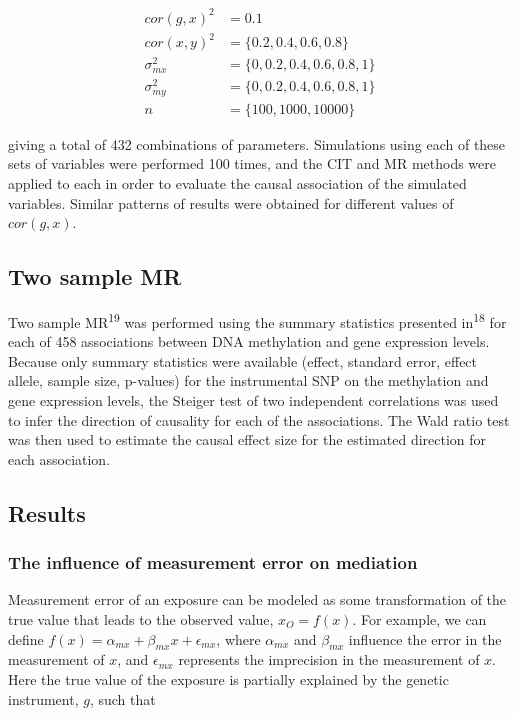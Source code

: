 \documentclass[]{article}
\begin{document}
\[
\begin{aligned}
cor(g, x)^2 & = 0.1 \\
cor(x, y)^2 & = \{0.2, 0.4, 0.6, 0.8\} \\
\sigma^2_{mx} & = \{0, 0.2, 0.4, 0.6, 0.8, 1\} \\
\sigma^2_{my} & = \{0, 0.2, 0.4, 0.6, 0.8, 1\} \\
n & = \{100, 1000, 10000\}
\end{aligned}
\]

giving a total of 432 combinations of parameters. Simulations using each
of these sets of variables were performed 100 times, and the CIT and MR
methods were applied to each in order to evaluate the causal association
of the simulated variables. Similar patterns of results were obtained
for different values of \(cor(g, x)\).

\subsection{Two sample MR}\label{two-sample-mr}

Two sample MR\textsuperscript{19} was performed using the summary
statistics presented in\textsuperscript{18} for each of 458 associations
between DNA methylation and gene expression levels. Because only summary
statistics were available (effect, standard error, effect allele, sample
size, p-values) for the instrumental SNP on the methylation and gene
expression levels, the Steiger test of two independent correlations was
used to infer the direction of causality for each of the associations.
The Wald ratio test was then used to estimate the causal effect size for
the estimated direction for each association.

\subsection{Results}\label{results}

\subsubsection{The influence of measurement error on
mediation}\label{the-influence-of-measurement-error-on-mediation}

Measurement error of an exposure can be modeled as some transformation
of the true value that leads to the observed value, \(x_O = f(x)\). For
example, we can define
\(f(x) = \alpha_{mx} + \beta_{mx} x + \epsilon_{mx}\), where
\(\alpha_{mx}\) and \(\beta_{mx}\) influence the error in the
measurement of \(x\), and \(\epsilon_{mx}\) represents the imprecision
in the measurement of \(x\). Here the true value of the exposure is
partially explained by the genetic instrument, \(g\), such that
\end{document}
